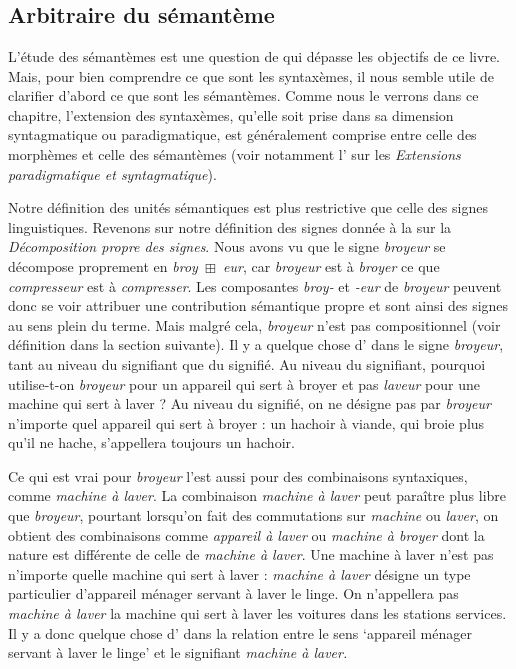 \chapter{}\label{sec:2.3}

\section{Arbitraire du sémantème}\label{sec:2.3.0}

L’étude des sémantèmes est une question de  qui dépasse les objectifs de ce livre. Mais, pour bien comprendre ce que sont les syntaxèmes, il nous semble utile de clarifier d’abord ce que sont les sémantèmes. Comme nous le verrons dans ce chapitre, l’extension des syntaxèmes, qu’elle soit prise dans sa dimension syntagmatique ou paradigmatique, est généralement comprise entre celle des morphèmes et celle des sémantèmes (voir notamment l’ sur les \textit{Extensions paradigmatique et syntagmatique}).

Notre définition des unités sémantiques est plus restrictive que celle des signes linguistiques. Revenons sur notre définition des signes donnée à la  sur la \textit{Décomposition propre des signes}. Nous avons vu que le signe \textit{broyeur} se décompose proprement en \textit{broy~}${\boxplus}$\textit{~eur}, car \textit{broyeur} est à \textit{broyer} ce que \textit{compresseur} est à \textit{compresser}. Les composantes \textit{broy-} et \textit{{}-eur} de \textit{broyeur} peuvent donc se voir attribuer une contribution sémantique propre et sont ainsi des signes au sens plein du terme. Mais malgré cela, \textit{broyeur} n’est pas compositionnel (voir définition dans la section suivante). Il y a quelque chose d’ dans le signe \textit{broyeur}, tant au niveau du signifiant que du signifié. Au niveau du signifiant, pourquoi utilise-t-on \textit{broyeur} pour un appareil qui sert à broyer et pas \textit{laveur} pour une machine qui sert à laver ? Au niveau du signifié, on ne désigne pas par \textit{broyeur} n’importe quel appareil qui sert à broyer : un hachoir à viande, qui broie plus qu’il ne hache, s’appellera toujours un hachoir.

Ce qui est vrai pour \textit{broyeur} l’est aussi pour des combinaisons syntaxiques, comme \textit{machine à laver}. La combinaison \textit{machine à laver} peut paraître plus libre que \textit{broyeur}, pourtant lorsqu’on fait des commutations sur \textit{machine} ou \textit{laver}, on obtient des combinaisons comme \textit{appareil à laver} ou \textit{machine à broyer} dont la nature est différente de celle de \textit{machine à laver}. Une machine à laver n’est pas n’importe quelle machine qui sert à laver : \textit{machine à laver} désigne un type particulier d’appareil ménager servant à laver le linge. On n’appellera pas \textit{machine à laver} la machine qui sert à laver les voitures dans les stations services. Il y a donc quelque chose d’ dans la relation entre le sens ‘appareil ménager servant à laver le linge’ et le signifiant \textit{machine à laver.}


